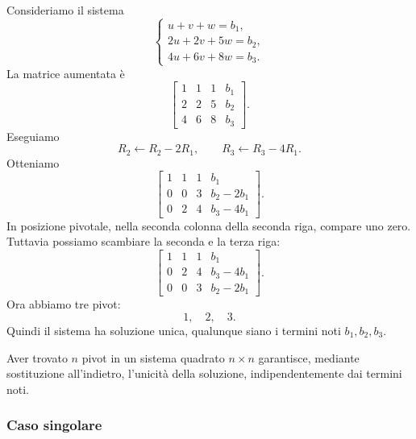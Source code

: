 \documentclass[a4paper]{article}
\begin{document}
Consideriamo il sistema
\[
    \begin{cases}
        u+v+w=b_1,\\
        2u+2v+5w=b_2,\\
        4u+6v+8w=b_3.
    \end{cases}
\]
La matrice aumentata è
\[
    \left[
        \begin{array}{ccc|c}
            1 & 1 & 1 & b_1\\
            2 & 2 & 5 & b_2\\
            4 & 6 & 8 & b_3
        \end{array}
    \right].
\]
Eseguiamo
\[
    R_2\leftarrow R_2-2R_1,
    \qquad
    R_3\leftarrow R_3-4R_1.
\]
Otteniamo
\[
    \left[
        \begin{array}{ccc|c}
            1 & 1 & 1 & b_1\\
            0 & 0 & 3 & b_2-2b_1\\
            0 & 2 & 4 & b_3-4b_1
        \end{array}
    \right].
\]
In posizione pivotale, nella seconda colonna della seconda riga, compare uno zero. Tuttavia possiamo scambiare la seconda e la terza riga:
\[
    \left[
        \begin{array}{ccc|c}
            1 & 1 & 1 & b_1\\
            0 & 2 & 4 & b_3-4b_1\\
            0 & 0 & 3 & b_2-2b_1
        \end{array}
    \right].
\]
Ora abbiamo tre pivot:
\[
    1,\quad 2,\quad 3.
\]
Quindi il sistema ha soluzione unica, qualunque siano i termini noti \(b_1,b_2,b_3\).

\begin{snippetremark}{}
    Aver trovato \(n\) pivot in un sistema quadrato \(n\times n\) garantisce, mediante sostituzione all'indietro, l'unicità della soluzione, indipendentemente dai termini noti.
\end{snippetremark}

\subsubsection{Caso singolare}
\end{document}
